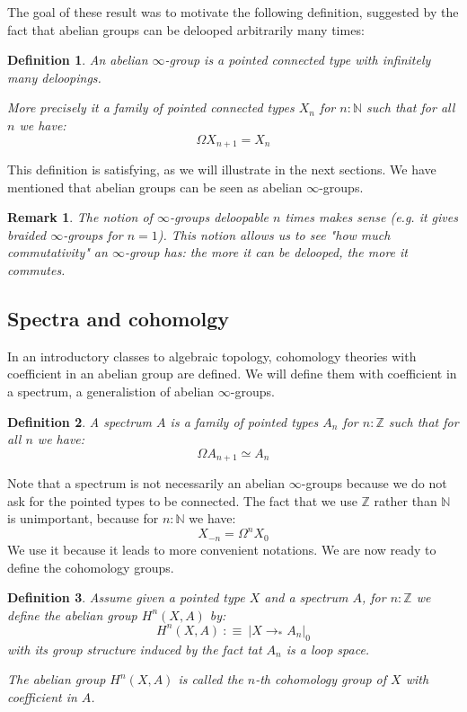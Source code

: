 \documentclass{article}
\newcommand{\sse}[1]{\medbreak \subsection{#1}}
\renewcommand{\r}{\rightarrow}
\newtheorem{definition}{Definition}
\newtheorem{remark}{Remark}
\begin{document}
The goal of these result was to motivate the following definition, suggested by the fact that abelian groups can be delooped arbitrarily many times:

\begin{definition}
An abelian $\infty$-group is a pointed connected type with infinitely many deloopings. 

More precisely it a family of pointed connected types $X_n$ for $n:\mathbb{N}$ such that for all $n$ we have:
\[\Omega X_{n+1} = X_n\]
\end{definition}

This definition is satisfying, as we will illustrate in the next sections. We have mentioned that abelian groups can be seen as abelian $\infty$-groups.

\begin{remark}
The notion of $\infty$-groups deloopable $n$ times makes sense (e.g. it gives braided $\infty$-groups for $n=1$). This notion allows us to see "how much commutativity" an $\infty$-group has: the more it can be delooped, the more it commutes.
\end{remark}




\sse{Spectra and cohomolgy}

In an introductory classes to algebraic topology, cohomology theories with coefficient in an abelian group are defined. We will define them with coefficient in a spectrum, a generalistion of abelian $\infty$-groups.%

\begin{definition}
A spectrum $A$ is a family of pointed types $A_n$ for $n:\mathbb{Z}$ such that for all $n$ we have:
\[\Omega A_{n+1} \simeq A_n\]
\end{definition}

Note that a spectrum is not necessarily an abelian $\infty$-groups because we do not ask for the pointed types to be connected. The fact that we use $\mathbb{Z}$ rather than $\mathbb{N}$ is unimportant, because for $n:\mathbb{N}$ we have: 
\[X_{-n} = \Omega^n X_0\]
We use it because it leads to more convenient notations. We are now ready to define the cohomology groups.

\begin{definition}
Assume given a pointed type $X$ and a spectrum $A$, for $n:\mathbb{Z}$ we define the abelian group $H^n(X,A)$ by: 
\[H^n(X,A)\ :\equiv\ |X\r_* A_n|_0\]
with its group structure induced by the fact tat $A_n$ is a loop space.

The abelian group $H^n(X,A)$ is called the $n$-th cohomology group of $X$ with coefficient in $A$.
\end{definition}
\end{document}
